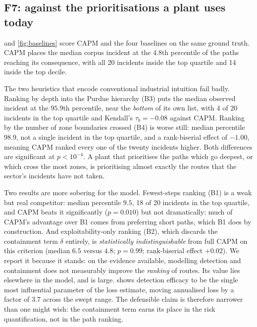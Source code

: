 

\subsection{F7: against the prioritisations a plant uses today}

 and \cref{fig:baselines} score CAPM and the four baselines
on the same ground truth. CAPM places the median corpus incident at the
$4.8$th percentile of the paths reaching its consequence, with all 20 incidents
inside the top quartile and 14 inside the top decile.

The two heuristics that encode conventional industrial intuition fail badly.
Ranking by depth into the Purdue hierarchy (B3) puts the median observed
incident at the $95.9$th percentile, near the \emph{bottom} of its own list,
with 4 of 20 incidents in the top quartile and Kendall's $\tau_b = -0.08$
against CAPM. Ranking by the number of zone boundaries crossed (B4) is worse
still: median percentile $98.9$, not a single incident in the top quartile, and
a rank-biserial effect of $-1.00$, meaning CAPM ranked every one of the twenty
incidents higher. Both differences are significant at $p < 10^{-4}$. A plant
that prioritises the paths which go deepest, or which cross the most zones, is
prioritising almost exactly the routes that the sector's incidents have not
taken.

Two results are more sobering for the model. Fewest-steps ranking (B1) is a
weak but real competitor: median percentile $9.5$, 18 of 20 incidents in the top
quartile, and CAPM beats it significantly ($p = 0.010$) but not dramatically:
much of CAPM's advantage over B1 comes from preferring short paths, which B1
does by construction. And exploitability-only ranking (B2), which discards the
containment term $\delta$ entirely, is \emph{statistically indistinguishable}
from full CAPM on this criterion (median $6.5$ versus $4.8$; $p = 0.99$;
rank-biserial effect $+0.02$). We report it because it stands: on the
evidence available, modelling detection and containment does not measurably
improve the \emph{ranking} of routes. Its value lies elsewhere in the model,
and is large.  shows detection efficacy to be the
single most influential parameter of the loss estimate, moving annualised loss
by a factor of $3.7$ across the swept range. The defensible claim is therefore
narrower than one might wish: the containment term earns its place in the risk
quantification, not in the path ranking.

